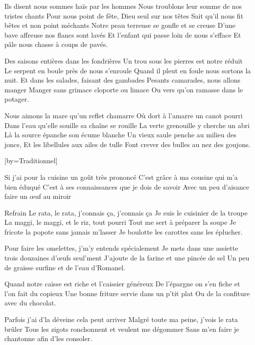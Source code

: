 \beginverse
Ils disent nous sommes haïs par les hommes
Nous troublons leur somme de nos tristes chants
Pour nous point de fête, Dieu seul sur nos têtes
Sait qu'il nous fit bêtes et non point méchants
Notre peau terreuse se gonfle et se creuse
D'une bave affreuse nos flancs sont lavés
Et l'enfant qui passe loin de nous s'efface
Et pâle nous chasse à coups de pavés.
\endverse

\beginverse
Des saisons entières dans les fondrières
Un trou sous les pierres est notre réduit
Le serpent en boule près de nous s'enroule
Quand il pleut en foule nous sortons la nuit.
Et dans les salades, faisant des gambades
Pesants camarades, nous allons manger
Manger sans grimace cloporte ou limace
Ou vers qu'on ramasse dans le potager.
\endverse

\beginverse
Nous aimons la mare qu'un reflet chamarre
Où dort à l'amarre un canot pourri
Dans l'eau qu'elle souille sa chaîne se rouille
La verte grenouille y cherche un abri
Là la source épanche son écume blanche
Un vieux saule penche au milieu des joncs,
Et les libellules aux ailes de tulle
Font crever des bulles au nez des goujons.
\endverse

[by={Traditionnel}]

\beginverse
Si j'ai pour la cuisine un goût très prononcé
C'est grâce à ma cousine qui m'a bien éduqué
C'est à ses connaissances que je dois de savoir
Avec un peu d'aisance faire un œuf au miroir \!
\endverse

	Refrain
Le rata, le rata, j'connais ça, j'connais ça
Je suis le cuisinier de la troupe
La maggi, le maggi, et le riz, tout pourri
Tout me sert à préparer la soupe
Je fricote la popote sans jamais m'lasser
Je boulotte les carottes sans les éplucher.

\beginverse
Pour faire les omelettes, j'm'y entends spécialement
Je mets dans une assiette trois douzaines d'œufs seul'ment
J'ajoute de la farine et une pincée de sel
Un peu de graisse surfine et de l'eau d'Romanel.
\endverse

\beginverse
Quand notre caisse est riche et l'caissier généreux
De l'épargne on s'en fiche et l'on fait du copieux
Une bonne friture servie dans un p'tit plat
Ou de la confiture avec du chocolat.
\endverse

\beginverse
Parfois j'ai d'la déveine cela peut arriver
Malgré toute ma peine, j'vois le rata brûler
Tous les zigots ronchonnent et veulent me dégommer
Sans m'en faire je chantonne afin d'les consoler.
\endverse


